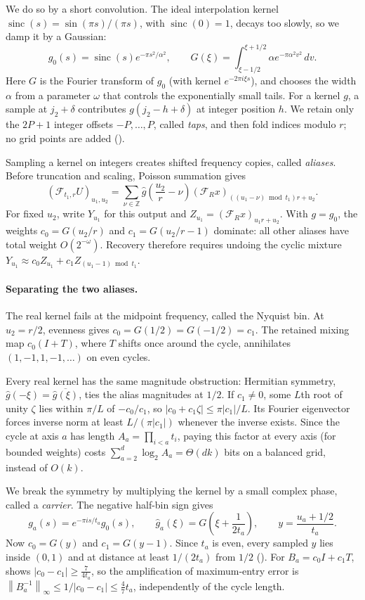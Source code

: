 \documentclass[11pt]{article}
\theoremstyle{definition}
\newcommand{\Z}{\mathbb{Z}}
\newcommand{\cF}{\mathcal{F}}
\newcommand{\sinc}{\operatorname{sinc}}
\newcommand{\norm}[1]{\left\lVert #1 \right\rVert}
\begin{document}
We do so by a short convolution.
The ideal interpolation kernel $\sinc(s)=\sin(\pi s)/(\pi s)$, with $\sinc(0)=1$, decays too slowly, so we damp it by a Gaussian:
\[
 g_0(s)=\sinc(s)e^{-\pi s^2/\alpha^2},
 \qquad
 G(\xi)=\int_{\xi-1/2}^{\xi+1/2}\alpha e^{-\pi\alpha^2v^2}\,dv.
\]
Here $G$ is the Fourier transform of $g_0$ (with kernel $e^{-2\pi i\xi s}$), and  chooses the width $\alpha$ from a parameter $\omega$ that controls the exponentially small tails.
For a kernel $g$, a sample at $j_2+\delta$ contributes $g(j_2-h+\delta)$ at integer position $h$.
We retain only the $2P+1$ integer offsets $-P,\ldots,P$, called \emph{taps}, and then fold indices modulo $r$; no grid points are added ().

Sampling a kernel on integers creates shifted frequency copies, called \emph{aliases}.
Before truncation and scaling, Poisson summation gives
\[
 (\cF_{t_1,r}U)_{u_1,u_2}
 =\sum_{\nu\in\Z}\widehat g\left(\frac{u_2}{r}-\nu\right)
   (\cF_Rx)_{((u_1-\nu)\bmod t_1)r+u_2}.
\]
For fixed $u_2$, write $Y_{u_1}$ for this output and $Z_{u_1}=(\cF_Rx)_{u_1r+u_2}$.
With $g=g_0$, the weights $c_0=G(u_2/r)$ and $c_1=G(u_2/r-1)$ dominate: all other aliases have total weight $O(2^{-\omega})$.
Recovery therefore requires undoing the cyclic mixture
$Y_{u_1}\approx c_0Z_{u_1}+c_1Z_{(u_1-1)\bmod t_1}$.

\paragraph{Separating the two aliases.}
The real kernel fails at the midpoint frequency, called the Nyquist bin.
At $u_2=r/2$, evenness gives $c_0=G(1/2)=G(-1/2)=c_1$.
The retained mixing map $c_0(I+T)$, where $T$ shifts once around the cycle, annihilates $(1,-1,1,-1,\ldots)$ on even cycles.

Every real kernel has the same magnitude obstruction: Hermitian symmetry,
$\widehat g(-\xi)=\overline{\widehat g(\xi)}$, ties the alias magnitudes at $1/2$.
If $c_1\ne0$, some $L$th root of unity $\zeta$ lies within $\pi/L$ of $-c_0/c_1$, so $|c_0+c_1\zeta|\le\pi|c_1|/L$.
Its Fourier eigenvector forces inverse norm at least $L/(\pi|c_1|)$ whenever the inverse exists.
Since the cycle at axis $a$ has length $A_a=\prod_{i<a}t_i$, paying this factor at every axis (for bounded weights) costs
$\sum_{a=2}^d\log_2 A_a=\Theta(dk)$ bits on a balanced grid, instead of $O(k)$.

We break the symmetry by multiplying the kernel by a small complex phase, called a \emph{carrier}.
The negative half-bin sign gives
\[
 g_a(s)=e^{-\pi is/t_a}g_0(s),\qquad
 \widehat g_a(\xi)=G\left(\xi+\frac1{2t_a}\right),\qquad
 y=\frac{u_a+1/2}{t_a}.
\]
Now $c_0=G(y)$ and $c_1=G(y-1)$.
Since $t_a$ is even, every sampled $y$ lies inside $(0,1)$ and at distance at least $1/(2t_a)$ from $1/2$ ().
For $B_a=c_0I+c_1T$,  shows $|c_0-c_1|\ge\frac7{4t_a}$, so the amplification of maximum-entry error is $\norm{B_a^{-1}}_\infty\le1/|c_0-c_1|\le\frac47t_a$, independently of the cycle length.
\end{document}
